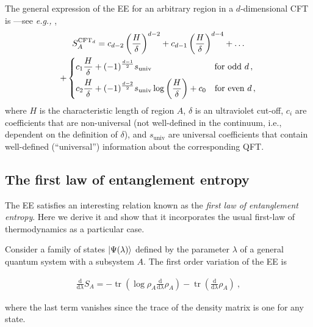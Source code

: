 \documentclass[twocolumn]{revtex4}
\providecommand{\eqgat}[2]{
    \begin{gather}
        #2
    \label{eq:#1}
    \end{gather}
}
\DeclareMathOperator{\tr}{tr}
\begin{document}
The general expression of the EE for an arbitrary region in a $d$-dimensional CFT is ---see {\emph{e.g.,}} \cite{nishioka_entanglement_2018},
\begin{gather}
    S_A^{\text{CFT}_d} = c_{d-2} \left( \frac{H}{\delta} \right) ^{d-2} + c_{d-1} \left( \frac{H}{\delta} \right) ^{d-4} + \dots \label{eq:EE_CFT} \\
    + \begin{dcases}
        c_1 \frac{H}{\delta} + (-1)^{\frac{d-1}{2}} s_{\text{univ}}
        \qquad \qquad \qquad \quad \ \text{for odd } d \, , \\
        c_2  \frac{H}{\delta} + (-1)^{\frac{d-2}{2}} s_{\text{univ}} \log \left ( \frac{H}{\delta} \right ) + c_0
        \quad \text{for even } d \, ,
    \end{dcases} \nonumber
\end{gather}
where $H$ is the characteristic length of region $A$, $\delta$ is an ultraviolet cut-off, $c_i$ are coefficients that are non-universal (not well-defined in the continuum, i.e., dependent on the definition of $\delta$), and $s_{\text{univ}}$ are universal coefficients that contain well-defined (``universal'') information about the corresponding QFT.


\subsection{The first law of entanglement entropy}
The EE satisfies an interesting relation known as the 
\emph{first law of entanglement entropy}. %
Here we derive it and show that it incorporates the usual first-law of thermodynamics as a particular case.

Consider a family of states $\ket{\Psi(\lambda)}$ defined by the parameter $\lambda$ of a general quantum system with a subsystem $A$. The first order variation of the EE is \cite{van_raamsdonk_lectures_2017}
\eqgat{varEE}{
    \frac{\mathrm{d}}{\mathrm{d} \lambda} S_A %
    = - \tr \left( \log \rho_A \frac{\mathrm{d}}{\mathrm{d} \lambda} \rho_A \right) - \tr \left( \frac{\mathrm{d}}{\mathrm{d} \lambda} \rho_A \right) \ ,
}
where the last term vanishes since the trace of the density matrix is one for any state.
\end{document}
